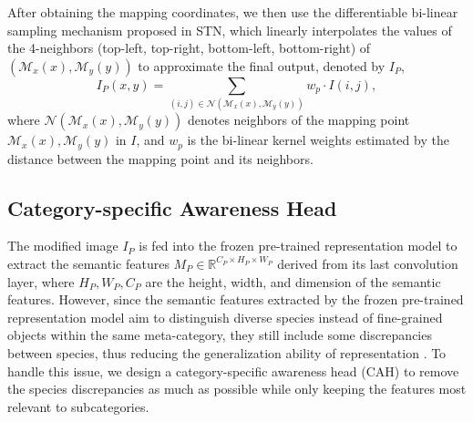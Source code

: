 \documentclass[letterpaper]{article} %
\begin{document}
After obtaining the mapping coordinates, we then use the differentiable bi-linear sampling mechanism proposed in STN, which linearly interpolates the values of the 4-neighbors (top-left, top-right, bottom-left, bottom-right) of $ (\mathcal{M}_x(x), \mathcal{M}_y(y)) $ to approximate the final output, denoted by $ I_P $,
\begin{equation}
I_P(x,y) = \sum_{(i,j)\in\mathcal{N}(\mathcal{M}_x(x), \mathcal{M}_y(y))} w_p \cdot I(i,j),
\end{equation}
where $ \mathcal{N}(\mathcal{M}_x(x), \mathcal{M}_y(y)) $ denotes neighbors of the mapping point $ \mathcal{M}_x(x), \mathcal{M}_y(y) $ in $ I $, and $ w_p $ is the bi-linear kernel weights estimated by the distance between the mapping point and its neighbors.

\subsection{Category-specific Awareness Head}
The modified image $ I_P $ is fed into the frozen pre-trained representation model to extract the semantic features $ M_P \in \mathbb{R}^{C_P\times H_P \times W_P} $ derived from its last convolution layer, where $ H_P, W_P, C_P $ are the height, width, and dimension of the semantic features.
However, since the semantic features extracted by the frozen pre-trained representation model aim to distinguish diverse species instead of fine-grained objects within the same meta-category, they still include some discrepancies between species, thus reducing the generalization ability of representation \cite{DBLP:conf/cvpr/WangWYLLL20,  DBLP:conf/mm/WangWZLZL19, DBLP:conf/aaai/WangWLDL20}. 
To handle this issue, we design a category-specific awareness head (CAH) to remove the species discrepancies as much as possible while only keeping the features most relevant to subcategories. 
\end{document}
